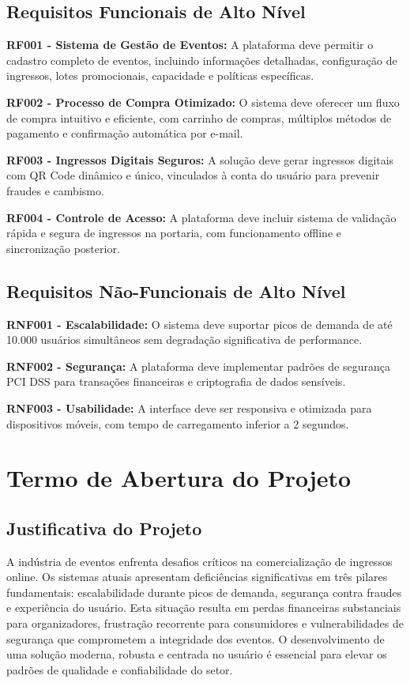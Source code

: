 \subsection{Requisitos Funcionais de Alto Nível}

\textbf{RF001 - Sistema de Gestão de Eventos:}
A plataforma deve permitir o cadastro completo de eventos, incluindo informações detalhadas, configuração de ingressos, lotes promocionais, capacidade e políticas específicas.

\textbf{RF002 - Processo de Compra Otimizado:}
O sistema deve oferecer um fluxo de compra intuitivo e eficiente, com carrinho de compras, múltiplos métodos de pagamento e confirmação automática por e-mail.

\textbf{RF003 - Ingressos Digitais Seguros:}
A solução deve gerar ingressos digitais com QR Code dinâmico e único, vinculados à conta do usuário para prevenir fraudes e cambismo.

\textbf{RF004 - Controle de Acesso:}
A plataforma deve incluir sistema de validação rápida e segura de ingressos na portaria, com funcionamento offline e sincronização posterior.

\subsection{Requisitos Não-Funcionais de Alto Nível}

\textbf{RNF001 - Escalabilidade:}
O sistema deve suportar picos de demanda de até 10.000 usuários simultâneos sem degradação significativa de performance.

\textbf{RNF002 - Segurança:}
A plataforma deve implementar padrões de segurança PCI DSS para transações financeiras e criptografia de dados sensíveis.

\textbf{RNF003 - Usabilidade:}
A interface deve ser responsiva e otimizada para dispositivos móveis, com tempo de carregamento inferior a 2 segundos.

\section{Termo de Abertura do Projeto}

\subsection{Justificativa do Projeto}

A indústria de eventos enfrenta desafios críticos na comercialização de ingressos online. Os sistemas atuais apresentam deficiências significativas em três pilares fundamentais: escalabilidade durante picos de demanda, segurança contra fraudes e experiência do usuário. Esta situação resulta em perdas financeiras substanciais para organizadores, frustração recorrente para consumidores e vulnerabilidades de segurança que comprometem a integridade dos eventos. O desenvolvimento de uma solução moderna, robusta e centrada no usuário é essencial para elevar os padrões de qualidade e confiabilidade do setor.

